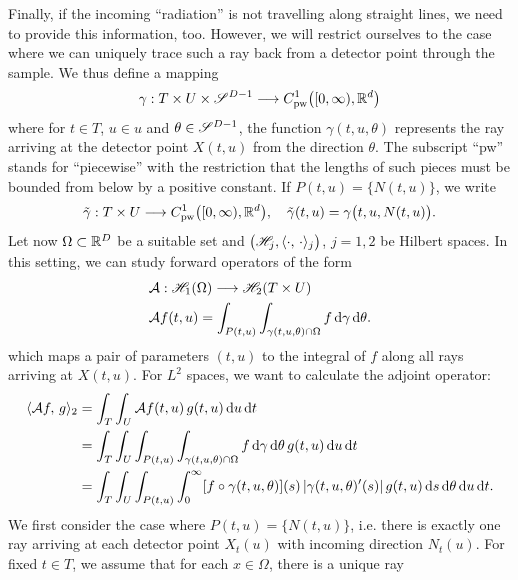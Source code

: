\documentclass{amsart}
\begin{document}
%
%
Finally, if the incoming ``radiation'' is not travelling along straight lines, we need to provide this information, too. However, we will 
restrict ourselves to the case where we can uniquely trace such a ray back from a detector point through the sample. We thus define a 
mapping
%
\begin{equation}
 \gamma: T \times U \times \mathscr{S}^{D-1} \longrightarrow C_{\mathrm{pw}}^1\big([0,\infty), {\mathbb{R}}^d\big)
\end{equation} 
%
where for $t \in T$, $u \in u$ and $\theta \in \mathscr{S}^{D-1}$, the function $\gamma(t, u, \theta)$ represents the ray arriving at the 
detector point $X(t, u)$ from the direction $\theta$. The subscript ``pw'' stands for ``piecewise'' with the restriction that the lengths 
of such pieces must be bounded from below by a positive constant.  If $P(t,u) = \lbrace N(t,u)\rbrace$, we write 
%
\begin{equation}
 \tilde \gamma: T \times U \longrightarrow C_{\mathrm{pw}}^1\big([0,\infty), {\mathbb{R}}^d\big),\quad \tilde \gamma(t,u) = \gamma\big(t, u, N(t,u)\big).
\end{equation}
%
%
Let now $\Omega \subset {\ensuremath{\mathbb{R}}}^D$ be a suitable set and $\big({\mathscr{H}}_j, \langle \cdot,\,\cdot\rangle_j\big)$, $j=1,2$ be Hilbert spaces. In this 
setting, we can study forward operators of the form
%
\begin{align}
 & {\mathcal{A}}: {\mathscr{H}}_1(\Omega) \longrightarrow {\ensuremath{\mathscr{H}}}_2(T \times U) \\
 & {\mathcal{A}} f(t, u) = \int_{P(t, u)} \int_{\gamma(t, u, \theta) \cap \Omega} f \, \mathrm{d} \gamma\, \mathrm{d} \theta.
\end{align}
%
which maps a pair of parameters $(t, u)$ to the integral of $f$ along all rays arriving at $X(t, u)$. For $L^2$ spaces, we want to 
calculate the adjoint operator:
%
\begin{align}
 \langle {\ensuremath{\mathcal{A}}} f,\,g\rangle_2 
 &= \int_T \int_U {\mathcal{A}} f(t, u)\, g(t, u)\, \mathrm{d} u\, \mathrm{d} t \notag \\
 &= \int_T \int_U \int_{P(t, u)} \int_{\gamma(t, u, \theta) \cap \Omega} f \, \mathrm{d} \gamma\, \mathrm{d} \theta\, g(t, u)\, \mathrm{d} u\, \mathrm{d} t \notag \\
 \label{eq:adj_calculation_step1}
 &= \int_T \int_U \int_{P(t, u)} \int_0^\infty  [f \circ \gamma(t, u, \theta)](s)\, |\gamma(t, u, \theta)'(s)|\, g(t, u)\, \mathrm{d} s\, 
 \mathrm{d} \theta\, \mathrm{d} u\, \mathrm{d} t.
\end{align}
%
We first consider the case where $P(t,u) = \lbrace N(t,u)\rbrace$, i.e. there is exactly one ray arriving at each detector point 
$X_t(u)$ with incoming direction $N_t(u)$. For fixed $t \in T$, we assume that for each $x \in \Omega$, there is a unique ray 
\end{document}
